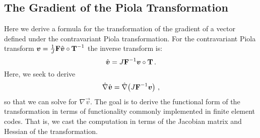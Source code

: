 \documentclass[../doc.tex]{subfiles}
\begin{document}
\subsection{The Gradient of the Piola Transformation} \label{fem_sec:grad_piola}
Here we derive a formula for the transformation of the gradient of a vector defined under the contravariant Piola transformation. For the contravariant Piola transform $\boldsymbol{v} = \frac{1}{J}\boldsymbol{\mathrm{F}}\hat{\boldsymbol{v}} \circ \boldsymbol{\mathrm{T}}^{-1}$ the inverse transform is: 
	\begin{equation}
		\hat{\boldsymbol{v}} = J\boldsymbol{\mathrm{F}}^{-1}\boldsymbol{v} \circ \boldsymbol{\mathrm{T}} \,. 
	\end{equation}
Here, we seek to derive 
	\begin{equation}
		\hat{\nabla}\hat{\boldsymbol{v}} = \hat{\nabla}\!\left( J\boldsymbol{\mathrm{F}}^{-1}\boldsymbol{v} \right) \,, 
	\end{equation}
so that we can solve for $\nabla\vec{v}$. The goal is to derive the functional form of the transformation in terms of functionality commonly implemented in finite element codes. That is, we cast the computation in terms of the Jacobian matrix and Hessian of the transformation. 
\end{document}
